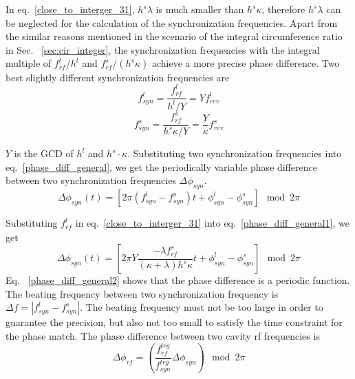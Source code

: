 In eq.~\ref{close_to_interger_31}, $h^s\lambda $ is much smaller than $h^s\kappa$, therefore $h^s\lambda $ can be neglected for the calculation of the synchronization frequencies. Apart from the similar reasons mentioned in the scenario of the integral circumference ratio in Sec. ~\ref{sec:cir_integer}, the synchronization frequencies with the integral multiple of $f_{\mathit{rf}}^{l}/h^l $ and $f_{\mathit{rf}}^{s}/(h^{s}\kappa)$ achieve a more precise phase difference. Two best slightly different synchronization frequencies are 
\begin{equation}
f_{\mathit{syn}}^{l}=\frac{f_{\mathit{rf}}^{l}}{h^{l}/Y}=Yf_{\mathit{rev}}^{l} \label{synch_freq11}
\end{equation}
\begin{equation}
f_{\mathit{syn}}^{s}=\frac{f_{\mathit{rf}}^{s}}{h^{s}\kappa/Y}=\frac{Y}{\kappa}f_{\mathit{rev}}^{s} \label{synch_freq22}
\end{equation}


$Y$ is the GCD of $h^l$ and $h^s \cdot \kappa$. Substituting two synchronization frequencies into eq.~\ref{phase_diff_general}, we get the periodically variable phase difference between two synchronization frequencies $\Delta \phi_\mathit{syn}$.
\begin{equation}
	\Delta \phi_\mathit{syn}(t)=[2\pi(f_{\mathit{syn}}^{l}-f_{\mathit{syn}}^{s})t+\phi_\mathit{syn}^l-\phi^s_\mathit{syn}] \mod 2\pi \label{phase_diff_general1}
\end{equation}

Substituting $f_{\mathit{rf}}^{l}$ in eq.~\ref{close_to_interger_31} into eq.~\ref{phase_diff_general1}, we get 
\begin{equation}
	\Delta \phi_\mathit{syn}(t)=[2\pi Y\frac{-{\lambda f_{\mathit{rf}}^{s}}}{(\kappa+\lambda)h^{s}\kappa}t+\phi_\mathit{syn}^l-\phi^s_\mathit{syn}] \mod 2\pi \label{phase_diff_general2}
\end{equation}
Eq. ~\ref{phase_diff_general2} shows that the phase difference is a periodic function. The beating frequency between two synchronization frequency is $\Delta f=|f_{\mathit{syn}}^{l}-f_{\mathit{syn}}^{s}|$. The beating frequency must not be too large in order to guarantee the precision, but also not too small to satisfy the time constraint for the phase match. The phase difference between two cavity rf frequencies is
\begin{equation}
\Delta \phi_\mathit{rf}=(\frac{f_{\mathit{rf}}^{trg}}{f_{\mathit{syn}}^{trg}}\Delta \phi_\mathit{syn}) \mod 2\pi 
\end{equation}

